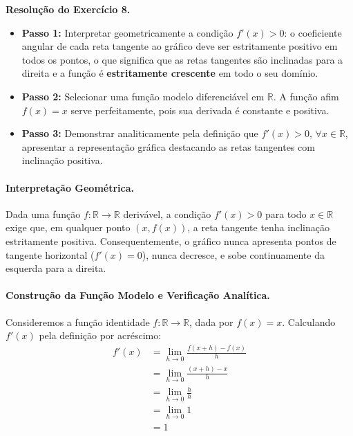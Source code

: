 \vspace{0.6cm}
\noindent\textbf{Resolução do Exercício 8.}
\label{res:7.2.8}
\setcounter{equation}{0}

\begin{estrategiabox}[title=Estratégia Geral de Resolução]
  \begin{itemize}[noitemsep, topsep=2pt]
    \item \textbf{Passo 1:} Interpretar geometricamente a condição $f'(x) > 0$: o coeficiente angular de cada reta tangente ao gráfico deve ser estritamente positivo em todos os pontos, o que significa que as retas tangentes são inclinadas para a direita e a função é \textbf{estritamente crescente} em todo o seu domínio.
    \item \textbf{Passo 2:} Selecionar uma função modelo diferenciável em $\mathbb{R}$. A função afim $f(x) = x$  serve perfeitamente, pois sua derivada é constante e positiva.
    \item \textbf{Passo 3:} Demonstrar analiticamente pela definição que $f'(x) > 0, \, \forall x \in \mathbb{R}$, apresentar a representação gráfica destacando as retas tangentes com inclinação positiva.
  \end{itemize}
\end{estrategiabox}

\paragraph{Interpretação Geométrica.}

Dada uma função $f:\mathbb{R} \to \mathbb{R}$ derivável, a condição $f'(x) > 0$ para todo $x \in \mathbb{R}$ exige que, em qualquer ponto $(x, f(x))$,
a reta tangente tenha inclinação estritamente positiva. Consequentemente, o gráfico nunca apresenta pontos de tangente horizontal ($f'(x) = 0$),
nunca decresce, e sobe continuamente da esquerda para a direita.

\paragraph{Construção da Função Modelo e Verificação Analítica.}

Consideremos a função identidade $f: \mathbb{R} \to \mathbb{R}$, dada por $f(x) = x$. Calculando $f'(x)$ pela definição por acréscimo:
\begin{align*}
f'(x) &= \lim_{h \to 0} \frac{f(x + h) - f(x)}{h} \\
      &= \lim_{h \to 0} \frac{(x + h) - x}{h} \\
      &= \lim_{h \to 0} \frac{h}{h} \\
      &= \lim_{h \to 0} 1 \\
      &= 1
\end{align*}

